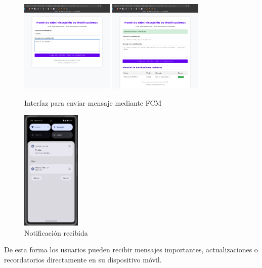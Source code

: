 \documentclass[a4paper,11pt]{report}
\begin{document}
      \begin{figure}[H]
        \centering
        \includegraphics[width=0.4\textwidth]{.img/mensaje_no_enviado.png}
        \hspace{2cm}
        \includegraphics[width=0.4\textwidth]{.img/mensaje_enviado.png}
        \caption{Interfaz para enviar mensaje mediante FCM}
        \label{fig:mensaje}
      \end{figure}
      \begin{figure}[H]
        \centering
        \includegraphics[width=0.25\textwidth]{.img/mensaje_notificacion.png}
        \caption{Notificación recibida}
        \label{fig:mensaje-notificacion}
      \end{figure}
      De esta forma los usuarios pueden recibir mensajes importantes, actualizaciones o recordatorios directamente en su dispositivo móvil.
\end{document}
